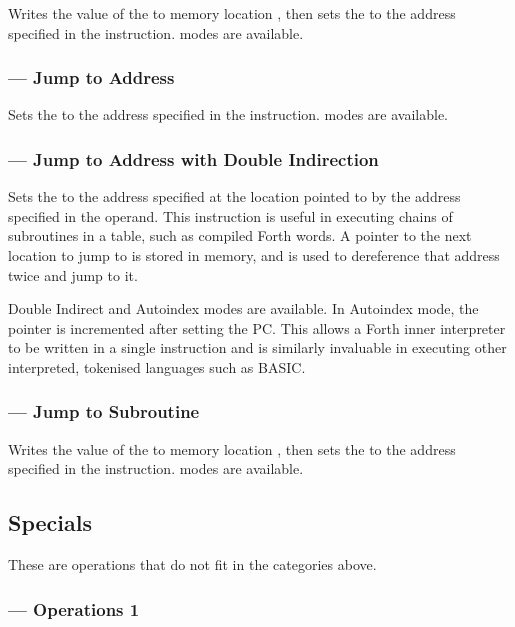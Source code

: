 Writes the value of the \PC{} to memory location , then sets the \PC
to the address specified in the instruction. \AMGroupTwo modes are available.

\subsubsection{ — Jump to Address}
\label{sec:instruction-JMP}

Sets the \PC{} to the address specified in the instruction. \AMGroupTwo modes
are available.

\subsubsection{ — Jump to Address with Double Indirection}
\label{sec:instruction-JMPII}

Sets the \PC{} to the address specified at the location pointed to by the
address specified in the operand. This instruction is useful in executing
chains of subroutines in a table, such as compiled Forth words. A pointer to
the next location to jump to is stored in memory, and  is used to
dereference that address twice and jump to it.

Double Indirect and Autoindex modes are available. In Autoindex mode, the
pointer is incremented after setting the PC. This allows a Forth inner
interpreter to be written in a single instruction and is similarly invaluable
in executing other interpreted, tokenised languages such as BASIC.

\subsubsection{ — Jump to Subroutine}
\label{sec:instruction-JSR}

Writes the value of the \PC{} to memory location , then sets the
\PC{} to the address specified in the instruction. \AMGroupTwo modes are
available.

\subsection{Specials}

These are operations that do not fit in the categories above.

\subsubsection{ — Operations 1}
\label{sec:op1}

